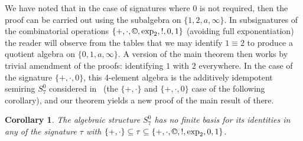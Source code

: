 \documentclass[eqnor,reqno]{amsart}
\theoremstyle{plain}
\newtheorem{cor}[thm]{Corollary}
\theoremstyle{definition}
\newcommand{\cc}{\mathbin{\textup{\copyright}}}
\begin{document}
We have noted that in the case of signatures where $0$ is not required, then the proof can be carried out using the subalgebra on $\{1,2,a,\infty\}$.  In subsignatures of the combinatorial operations $\{+,\cdot,\cc,\exp_2,!,0,1\}$ (avoiding full exponentiation) the reader will observe from the tables that we may identify $1\equiv 2$ to produce a quotient algebra on $\{0,1,a,\infty\}$.  
A version of the main theorem then works by trivial amendment of the proofs: identifying $1$ with $2$ everywhere.  In the case of the signature $\{+,\cdot,0\}$, this 4-element algebra is the additively idempotent semiring $S_7^0$ considered in~\cite{WRZ} (the $\{+,\cdot\}$ and $\{+,\cdot,0\}$ case of the following corollary), and our theorem yields a new proof of the main result of there.
\begin{cor}
The algebraic structure $S_7^0$ has no finite basis for its identities in any of the signature $\tau$ with $\{+,\cdot\}\subseteq\tau\subseteq\{+,\cdot,\cc,!,\exp_2,0,1\}$.
\end{cor}
\end{document}
